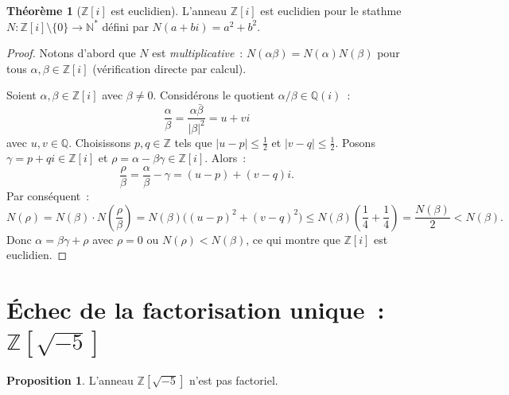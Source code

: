 \documentclass[12pt,a4paper,openany]{book}
\theoremstyle{definition}
\newtheorem{theoreme}{Théorème}[chapter]
\newtheorem{proposition}{Proposition}[chapter]
\newcommand{\N}{\mathbb{N}}
\newcommand{\Z}{\mathbb{Z}}
\newcommand{\Q}{\mathbb{Q}}
\begin{document}
\begin{theoreme}[{$\Z[i]$} est euclidien]\label{thm:Zi-euclidien}
L'anneau $\Z[i]$ est euclidien pour le stathme
$N \colon \Z[i] \setminus \{0\} \to \N^*$ défini par
$N(a + bi) = a^2 + b^2$.
\end{theoreme}

\begin{proof}
Notons d'abord que $N$ est \emph{multiplicative}~:
$N(\alpha\beta) = N(\alpha)N(\beta)$ pour tous
$\alpha, \beta \in \Z[i]$ (vérification directe par calcul).

Soient $\alpha, \beta \in \Z[i]$ avec $\beta \neq 0$. Considérons le
quotient $\alpha/\beta \in \Q(i)$~:
\[
  \frac{\alpha}{\beta}
  = \frac{\alpha \bar{\beta}}{|\beta|^2}
  = u + vi
\]
avec $u, v \in \Q$. Choisissons $p, q \in \Z$ tels que $|u - p|
\leqslant \frac{1}{2}$ et $|v - q| \leqslant \frac{1}{2}$. Posons
$\gamma = p + qi \in \Z[i]$ et $\rho = \alpha - \beta\gamma \in \Z[i]$.
Alors~:
\[
  \frac{\rho}{\beta} = \frac{\alpha}{\beta} - \gamma
  = (u - p) + (v - q)i.
\]
Par conséquent~:
\[
  N(\rho) = N(\beta) \cdot N\!\left(\frac{\rho}{\beta}\right)
  = N(\beta) \bigl((u-p)^2 + (v-q)^2\bigr)
  \leqslant N(\beta) \left(\frac{1}{4} + \frac{1}{4}\right)
  = \frac{N(\beta)}{2} < N(\beta).
\]
Donc $\alpha = \beta\gamma + \rho$ avec $\rho = 0$ ou
$N(\rho) < N(\beta)$, ce qui montre que $\Z[i]$ est euclidien.
\end{proof}

\section{Échec de la factorisation unique~: $\Z[\sqrt{-5}]$}%
\label{sec:echec-factorisation}
\index{$\Z[\sqrt{-5}]$}

\begin{proposition}\label{prop:Z-sqrt-5-non-UFD}
L'anneau $\Z[\sqrt{-5}]$ n'est pas factoriel.
\end{proposition}
\end{document}
